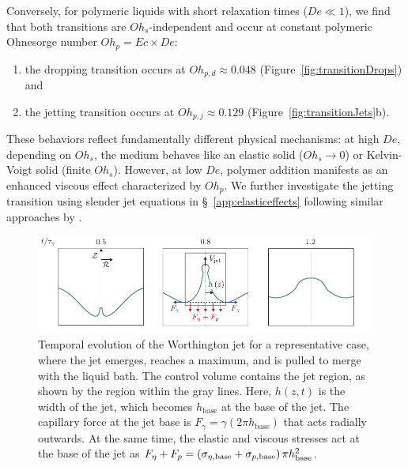 \documentclass{jfm}
\newcommand{\DL}[1]{{\textcolor{black}{#1}}}
\newcommand{\oo}{\color{black} \normalfont}
\newcommand{\bb}{\color{black} \normalfont}
\begin{document}
Conversely, for polymeric liquids with short relaxation times ($De \ll 1$), we find that both transitions are $Oh_s$-independent and occur at constant polymeric Ohnesorge number $Oh_p = Ec \times De$:

\begin{enumerate}
	\item the dropping transition occurs at $Oh_{p,d} \approx 0.048$ (Figure~\ref{fig:transitionDrops}) and
	\item the jetting transition occurs at $Oh_{p,j} \approx 0.129$ (Figure~\ref{fig:transitionJets}b).
\end{enumerate}

\oo

These behaviors reflect fundamentally different physical mechanisms: at high $De$, depending on $Oh_s$, the medium behaves like an elastic solid ($Oh_s \to 0$) or Kelvin-Voigt solid (finite $Oh_s$). However, at low $De$, polymer addition manifests as an enhanced viscous effect characterized by $Oh_p$. \bb
We further investigate the jetting transition using slender jet equations in \S~\ref{app:elasticeffects} following similar approaches by \citet{driessen2013stability,gordillo2020impulsive,zinelis2023transition,sen2024elastocapillary}.

\begin{figure}
	\centering
	\includegraphics[width=\textwidth]{jetSchematic_02-eps-converted-to.pdf}
	\caption{
		Temporal evolution of the Worthington jet for a representative case, where the jet emerges, reaches a maximum, and is pulled to merge with the liquid bath. The control volume contains the jet region, as shown by the region within the gray lines. Here, $h(z,t)$ is the width of the jet, which becomes $h_{\text{base}}$ at the base of the jet. The capillary force at the jet base is $F_\gamma = \gamma \left(2 \pi h_{\text{base}} \right)$ that acts radially outwards. At the same time, the elastic and viscous stresses act at the base of the jet as $\DL{F_\eta + F_p  = \left( \sigma_{\eta, \text{base}} + \sigma_{p, \text{base}}\right) \pi h_{\text{base}}^2}$.
	}
	\label{fig:jetSchematic}
\end{figure}
\end{document}
